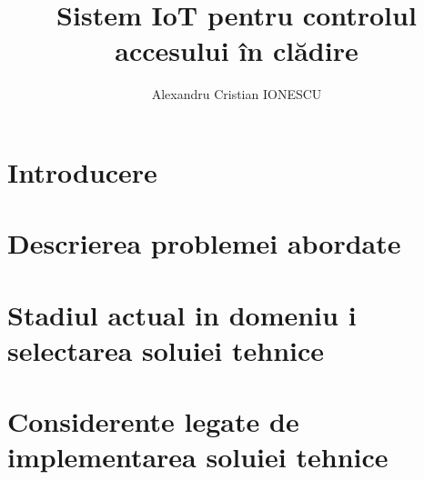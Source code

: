 \documentclass[a4paper,12pt]{scrreprt}                       %
\begin{document}

\title{Sistem IoT pentru controlul\\accesului \^{i}n clădire}
\author{Alexandru Cristian IONESCU}

\maketitle


\tableofcontents 

\clearpage


\chapter{Introducere}


\chapter{Descrierea problemei abordate}


\chapter{Stadiul actual in domeniu i selectarea soluiei tehnice}


\chapter{Considerente legate de implementarea soluiei tehnice}

\end{document}

